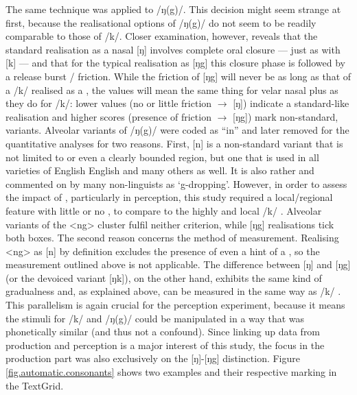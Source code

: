 The same technique was applied to /ŋ(g)/.
This decision might seem strange at first, because the realisational options of /ŋ(g)/ do not seem to be readily comparable to those of /k/.
Closer examination, however, reveals that the standard realisation as a nasal [ŋ] involves complete oral closure --- just as with [k] --- and that for the typical  realisation as [ŋg] this closure phase is followed by a release burst / friction.
While the friction of [ŋg] will never be as long as that of a /k/ realised as a , the  values will mean the same thing for velar nasal plus as they do for /k/: lower values (no or little friction \(\rightarrow\) [ŋ]) indicate a standard-like realisation and higher scores (presence of friction \(\rightarrow\) [ŋg]) mark non-standard,  variants.
Alveolar variants of /ŋ(g)/ were coded as ``in'' and later removed for the quantitative analyses for two reasons.
First, [n] is a non-standard variant that is not limited to  or even a clearly bounded region, but one that is used in all varieties of English English and many others as well.
It is also rather  and commented on by many non-linguists as \enquote*{g-dropping}.
However, in order to assess the impact of , particularly in perception, this study required a local/regional feature with little or no , to compare to the highly  and local /k/ .
Alveolar variants of the <ng> cluster fulfil neither criterion, while [ŋg] realisations tick both boxes.
The second reason concerns the method of measurement.
Realising <ng> as [n] by definition excludes the presence of even a hint of a , so the  measurement outlined above is not applicable.
The difference between [ŋ] and [ŋg] (or the devoiced variant [ŋk]), on the other hand, exhibits the same kind of gradualness and, as explained above, can be measured in the same way as /k/ .
This parallelism is again crucial for the perception experiment, because it means the stimuli for /k/ and /ŋ(g)/ could be manipulated in a way that was phonetically similar (and thus not a confound).
Since linking up data from production and perception is a major interest of this study, the focus in the production part was also exclusively on the [ŋ]-[ŋg] distinction.
Figure \ref{fig.automatic.consonants} shows two examples and their respective marking in the TextGrid.

